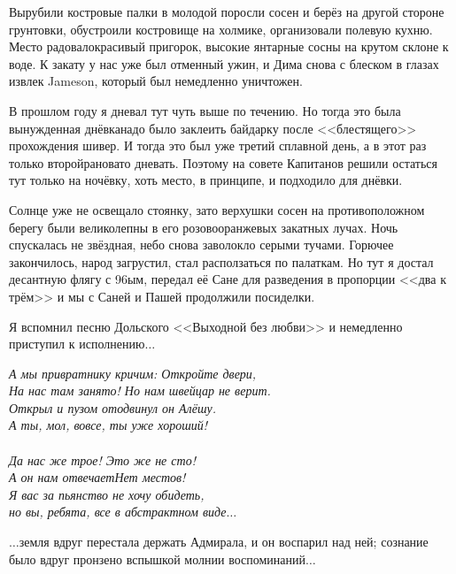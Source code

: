 Вырубили костровые палки в молодой поросли сосен и берёз на другой стороне грунтовки, обустроили костровище на холмике, организовали полевую кухню. Место радовало\mdash красивый пригорок, высокие янтарные сосны на крутом склоне к воде. К закату у нас уже был отменный ужин, и Дима снова с блеском в глазах извлек Jameson, который был немедленно уничтожен. 

В прошлом году я дневал тут чуть выше по течению. Но тогда это была вынужденная днёвка\mdash  надо было заклеить байдарку после <<блестящего>> прохождения шивер. И тогда это был уже третий сплавной день, а в этот раз только второй\mdash  рановато дневать. Поэтому на совете Капитанов решили остаться тут только на ночёвку, хоть место, в принципе, и подходило для днёвки.

Солнце уже не освещало стоянку, зато верхушки сосен на противоположном берегу были великолепны в его розово\sdash оранжевых закатных лучах. Ночь спускалась не звёздная, небо снова заволокло серыми тучами. Горючее закончилось, народ загрустил, стал расползаться по палаткам. Но тут я достал десантную флягу с 96\sdash ым, передал её Сане для разведения в пропорции <<два к трём>> и мы с Саней и Пашей продолжили посиделки. 

Я вспомнил песню Дольского <<Выходной без любви>> и немедленно приступил к исполнению$\ldots$  

\vspace{0.5cm}
\noindent\textit{А мы привратнику кричим: Откройте двери, \\
На нас там занято! Но нам швейцар не верит. \\
Открыл и пузом отодвинул он Алёшу. \\
\diagdash А ты, мол, вовсе, ты уже хороший!\\
\\
\diagdash Да нас же трое! Это же не сто!\\
А он нам отвечает\mdash Нет местов!\\
Я вас за пьянство не хочу обидеть,\\
но вы, ребята, все в абстрактном виде$\ldots$ 
}
\vspace{0.5cm}

$\ldots$земля вдруг перестала держать Адмирала, и он воспарил над ней; сознание было вдруг пронзено вспышкой молнии воспоминаний$\ldots$


